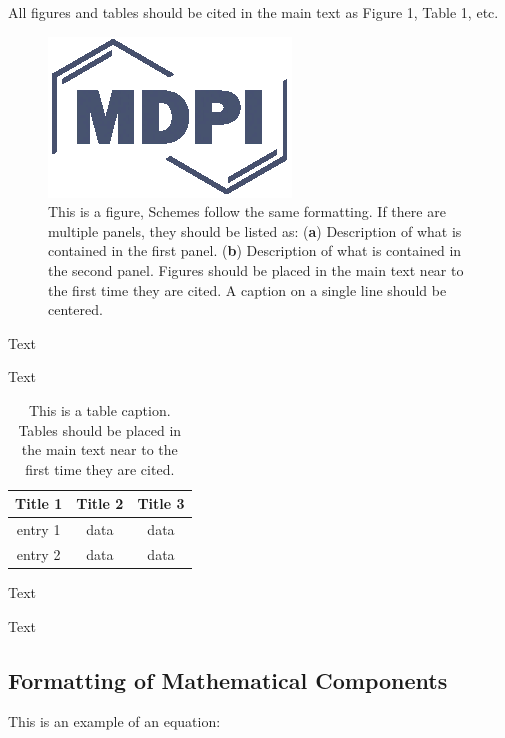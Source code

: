 \documentclass[hydrology,article,submit,moreauthors,pdftex]{Definitions/mdpi}
\begin{document}
All figures and tables should be cited in the main text as Figure 1, Table 1, etc.

\begin{figure}[H]
\centering
\includegraphics[width=2 cm]{Definitions/logo-mdpi}
\caption{This is a figure, Schemes follow the same formatting. If there are multiple panels, they should be listed as: (\textbf{a}) Description of what is contained in the first panel. (\textbf{b}) Description of what is contained in the second panel. Figures should be placed in the main text near to the first time they are cited. A caption on a single line should be centered.}
\end{figure}   
 
Text

Text

\begin{table}[H]
\caption{This is a table caption. Tables should be placed in the main text near to the first time they are cited.}
\centering
\begin{tabular}{ccc}
\toprule
\textbf{Title 1}	& \textbf{Title 2}	& \textbf{Title 3}\\
\midrule
entry 1		& data			& data\\
entry 2		& data			& data\\
\bottomrule
\end{tabular}
\end{table}

Text

Text



\subsection{Formatting of Mathematical Components}

This is an example of an equation:
\end{document}
